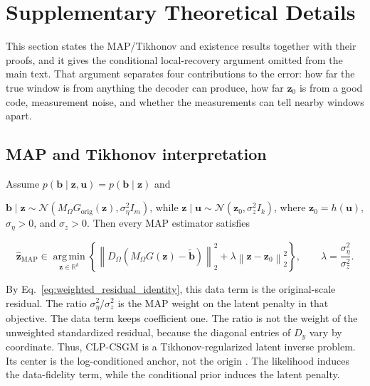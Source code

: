 \section{Supplementary Theoretical Details}
\label{app:theory}

This section states the MAP/Tikhonov and existence results together with
their proofs, and it gives the conditional local-recovery argument omitted
from the main text. That argument separates four
contributions to the error: how far the true window is from anything the
decoder can produce, how far $\boldsymbol{z}_0$ is from a good code,
measurement noise, and whether the measurements can tell nearby windows apart.

\subsection{MAP and Tikhonov interpretation}
\label{app:map_proof}

\begin{proposition}
\label{prop:map}
Assume
$p(\boldsymbol{b}\mid\boldsymbol{z},\boldsymbol{u})
=p(\boldsymbol{b}\mid\boldsymbol{z})$ and

$\boldsymbol{b}\mid\boldsymbol{z}
\sim
\mathcal{N}
\left(
M_{\Omega}G_{\mathrm{orig}}(\boldsymbol{z}),
\sigma_{\eta}^{2}I_m
\right)$,
while
$\boldsymbol{z}\mid\boldsymbol{u}
\sim
\mathcal{N}
\left(
\boldsymbol{z}_0,
\sigma_z^{2}I_k
\right)$,
where
$\boldsymbol{z}_0=h(\boldsymbol{u})$,
$\sigma_{\eta}>0$, and $\sigma_z>0$.
Then every MAP estimator satisfies

\begin{equation}
\widehat{\boldsymbol{z}}_{\mathrm{MAP}}
\in
\operatorname*{arg\,min}_{\boldsymbol{z}\in\mathbb{R}^{k}}
\left\{
\left\|
D_{\Omega}
\left(
M_{\Omega}G(\boldsymbol{z})
-
\widetilde{\boldsymbol{b}}
\right)
\right\|_2^2
+
\lambda
\left\|
\boldsymbol{z}
-
\boldsymbol{z}_0
\right\|_2^2
\right\},
\qquad
\lambda
=
\frac{\sigma_{\eta}^{2}}{\sigma_z^{2}}.
\label{eq:map_tikhonov_objective}
\end{equation}

By Eq.~\eqref{eq:weighted_residual_identity}, this data term is the
original-scale residual. The ratio
$\sigma_{\eta}^{2}/\sigma_{z}^{2}$ is the MAP weight on the latent penalty
in that objective. The data term keeps coefficient one. The ratio is not
the weight of the unweighted standardized residual, because the diagonal
entries of $D_y$ vary by coordinate. Thus, CLP-CSGM is a
Tikhonov-regularized latent inverse problem. Its center is
the log-conditioned anchor, not the origin
\citep{tikhonov1963solution,burger2014map}. The likelihood induces the
data-fidelity term, while the conditional prior induces the latent penalty.
\end{proposition}

